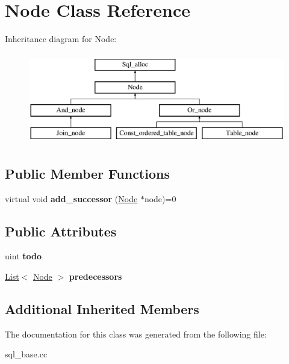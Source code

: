 \hypertarget{classNode}{}\section{Node Class Reference}
\label{classNode}
Inheritance diagram for Node\+:\begin{figure}[H]
\begin{center}
\leavevmode
\includegraphics[height=4.000000cm]{classNode}
\end{center}
\end{figure}
\subsection*{Public Member Functions}
\begin{DoxyCompactItemize}
\item 
\mbox{\label{classNode_a6ec5d2e549da7babb58aafdc6c533aac}} 
virtual void {\bfseries add\+\_\+successor} (\mbox{\hyperlink{classNode}{Node}} $\ast$node)=0
\end{DoxyCompactItemize}
\subsection*{Public Attributes}
\begin{DoxyCompactItemize}
\item 
\mbox{\label{classNode_adc1740200124201ebddd78183b6b1c7d}} 
uint {\bfseries todo}
\item 
\mbox{\label{classNode_a52e48ae5a982b400683c0de08e2a7609}} 
\mbox{\hyperlink{classList}{List}}$<$ \mbox{\hyperlink{classNode}{Node}} $>$ {\bfseries predecessors}
\end{DoxyCompactItemize}
\subsection*{Additional Inherited Members}


The documentation for this class was generated from the following file\+:\begin{DoxyCompactItemize}
\item 
sql\+\_\+base.\+cc\end{DoxyCompactItemize}
